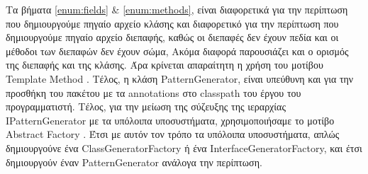 Τα βήματα \ref{enum:fields} \& \ref{enum:methods}, είναι διαφορετικά για την περίπτωση που δημιουργούμε πηγαίο αρχείο κλάσης 
και διαφορετικό για την περίπτωση που δημιουργούμε πηγαίο αρχείο διεπαφής, καθώς οι διεπαφές δεν έχουν πεδία 
και οι μέθοδοι των διεπαφών δεν έχουν σώμα, Ακόμα διαφορά παρουσιάζει και ο ορισμός της διεπαφής και της κλάσης. 
Άρα κρίνεται απαραίτητη η χρήση του μοτίβου Template Method \cite{GoF}. Τέλος, η κλάση PatternGenerator, 
είναι υπεύθυνη και για την προσθήκη του πακέτου με τα annotations στο classpath του έργου του προγραμματιστή.
\newline \newline
Τέλος, για την μείωση της σύζευξης της ιεραρχίας IPatternGenerator με τα υπόλοιπα υποσυστήματα, 
χρησιμοποιήσαμε το μοτίβο Abstract Factory \cite{GoF}. Έτσι με αυτόν τον τρόπο τα υπόλοιπα υποσυστήματα, 
απλώς δημιουργούνε ένα \mbox{ClassGeneratorFactory} ή ένα \mbox{InterfaceGeneratorFactory}, 
και έτσι δημιουργούν έναν PatternGenerator ανάλογα την περίπτωση.
